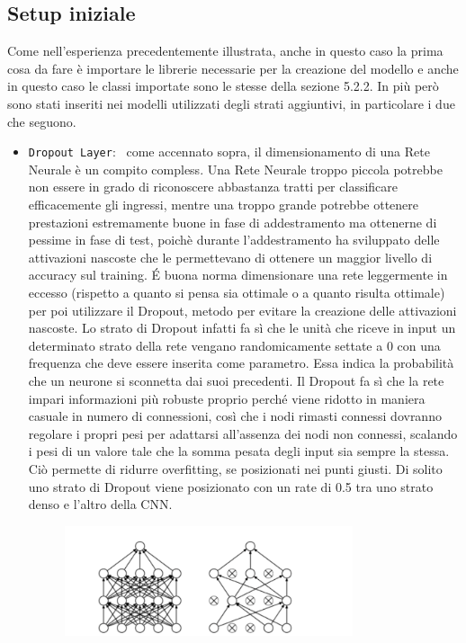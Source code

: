 \subsection{Setup iniziale}
 Come nell’esperienza precedentemente illustrata, anche in questo caso la prima cosa da fare 
 è importare le librerie necessarie per la creazione del modello e anche in questo caso le classi
  importate sono le stesse della sezione 5.2.2. In più però sono stati inseriti nei modelli utilizzati
  degli strati aggiuntivi, in particolare i due che seguono.
\begin{itemize} 
\item \lstinline{Dropout Layer}:~\cite{dropout} come accennato sopra, il dimensionamento di una Rete Neurale è 
un compito compless. Una Rete Neurale troppo
 piccola potrebbe non essere in grado di riconoscere abbastanza
tratti per classificare efficacemente gli ingressi, mentre una troppo grande potrebbe ottenere 
prestazioni estremamente buone in fase di addestramento ma ottenerne di pessime in fase di test,
 poichè durante l’addestramento ha sviluppato delle attivazioni nascoste che le permettevano di ottenere
  un maggior livello di accuracy sul training. É buona norma dimensionare una rete leggermente in eccesso 
  (rispetto a quanto si pensa sia ottimale o a quanto risulta ottimale) per poi utilizzare il Dropout,
   metodo per evitare la creazione delle attivazioni nascoste. 
   Lo strato di Dropout infatti fa sì che
    le unità che riceve in input un determinato strato della rete vengano randomicamente settate a 0 con una frequenza che deve essere 
    inserita come parametro. Essa indica la probabilità che un neurone si sconnetta dai suoi precedenti.
     Il Dropout fa sì che la rete impari informazioni più robuste proprio perché viene ridotto in maniera
      casuale in numero di connessioni, così che i nodi rimasti connessi dovranno regolare i propri pesi 
      per adattarsi all’assenza dei nodi non connessi, scalando i pesi di un valore tale che la somma 
      pesata degli input sia sempre la stessa. Ciò permette di ridurre overfitting, se posizionati nei punti giusti.
       Di solito uno strato di Dropout viene posizionato con un rate di 0.5 tra uno strato denso e l’altro della CNN.
       \begin{figure}[H]
        \centering
        \includegraphics[width=0.8\textwidth]{Figures/dropout.png}

\end{figure}
\end{itemize}
